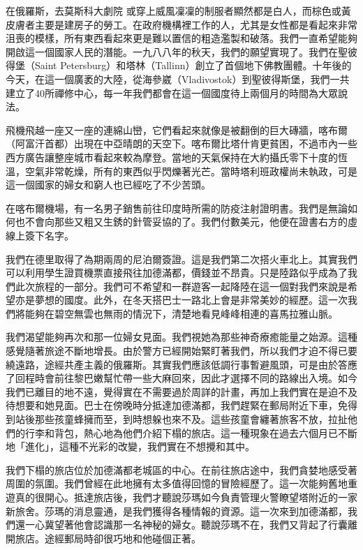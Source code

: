 在俄羅斯，去莫斯科大劇院%
或穿上威風凜凜的制服者顯然都是白人，而棕色或黃皮膚者主要是建房子的勞工。在政府機構裡工作的人，尤其是女性都是看起來非常沮喪的模樣，所有東西看起來更是難以置信的粗造濫製和破落。我們一直希望能夠開啟這一個國家人民的潛能。一九八八年的秋天，我們的願望實現了。我們在聖彼得堡（Saint Petersburg）和塔林（Tallinn）創立了首個地下佛教團體。十年後的今天，在這一個廣袤的大陸，從海參崴（Vladivostok）到聖彼得斯堡，我們一共建立了40所禪修中心，每一年我們都會在這一個國度待上兩個月的時間為大眾說法。

飛機飛越一座又一座的連綿山巒，它們看起來就像是被翻倒的巨大磚牆，喀布爾（阿富汗首都）出現在中亞晴朗的天空下。喀布爾比塔什肯更貧困，不過市內一些西方廣告讓整座城市看起來較為摩登。當地的天氣保持在大約攝氏零下十度的恆溫，空氣非常乾燥，所有的東西似乎閃爍著光芒。當時塔利班政權尚未執政，可是這一個國家的婦女和窮人也已經吃了不少苦頭。

在喀布爾機場，有一名男子銷售前往印度時所需的防疫注射證明書。我們是無論如何也不會向那些又粗又生銹的針管妥協的了。我們付數美元，他便在證書右方的虛線上簽下名字。

我們在德里取得了為期兩周的尼泊爾簽證。這是我們第二次搭火車北上。其實我們可以利用學生證買機票直接飛往加德滿都，價錢並不昂貴。只是陸路似乎成為了我們此次旅程的一部分。我們可不希望和一群遊客一起降陸在這一個對我們來說是希望亦是夢想的國度。此外，在冬天搭巴士一路北上會是非常美妙的經歷。這一次我們將能夠在碧空無雲也無雨的情況下，清楚地看見峰峰相連的喜馬拉雅山脈。

我們渴望能夠再次和那一位婦女見面。我們視她為那些神奇療癒能量之始源。這種感覺隨著旅途不斷地增長。由於警方已經開始緊盯著我們，所以我們才迫不得已要繞遠路，途經共產主義的俄羅斯。其實我們應該低調行事暫避風頭，可是由於答應了回程時會前往黎巴嫩幫忙帶一些大麻回來，因此才選擇不同的路線出入境。如今我們已離目的地不遠，覺得實在不需要過於周詳的計畫，再加上我們實在是迫不及待想要和她見面。巴士在傍晚時分抵達加德滿都，我們趕緊在郵局附近下車，免得到站後那些孩童蜂擁而至，到時想躲也來不及。這些孩童會纏著旅客不放，拉扯他們的行李和背包，熱心地為他們介紹下榻的旅店。這一種現象在過去六個月已不斷地「進化」，這種不光彩的改變，我們實在不想攪和其中。

我們下榻的旅店位於加德滿都老城區的中心。在前往旅店途中，我們貪婪地感受著周圍的氛圍。我們曾經在此地擁有太多值得回憶的冒險經歷了。這一次能夠舊地重遊真的很開心。抵達旅店後，我們才聽說莎瑪如今負責管理火警瞭望塔附近的一家新旅舍。莎瑪的消息靈通，是我們獲得各種情報的資源。這一次來到加德滿都，我們還一心冀望著他會認識那一名神秘的婦女。聽說莎瑪不在，我們又背起了行囊離開旅店。途經郵局時卻很巧地和他碰個正著。


